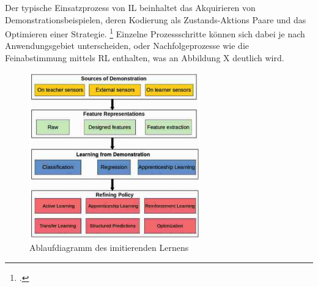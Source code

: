 Der typische Einsatzprozess von IL beinhaltet das Akquirieren von Demonstrationsbeispielen, deren Kodierung als Zustands-Aktions Paare und das Optimieren einer Strategie. \footcite[Vgl.][S. 3]{Hussein.2017}
Einzelne Prozessschritte können sich dabei je nach Anwendungsgebiet unterscheiden, oder Nachfolgeprozesse wie die Feinabstimmung mittels RL enthalten, was an Abbildung X deutlich wird.
\begin{figure}[htb]
    \centering
    \includegraphics[height=7.2cm]{lib/graphics/IL flowchart.png}
    \caption[Ablaufdiagramm des imitierenden Lernens]{Ablaufdiagramm des imitierenden Lernens\footnotemark}
    \label{abb:IL-process-flowchart}
\end{figure}
